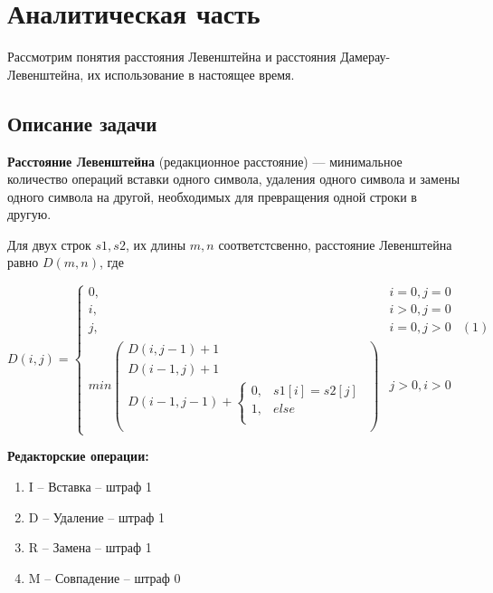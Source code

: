 \documentclass[a4paper,14pt]{article} %
\begin{document}
	\newpage


        \section{Аналитическая часть}
        \hfill
        
        Рассмотрим понятия расстояния Левенштейна и расстояния Дамерау-Левенштейна, их использование в настоящее время. 
        
        \subsection{Описание задачи}
        \hfill
        
        \textbf{Расстояние Левенштейна}  (редакционное расстояние) — минимальное количество операций вставки одного символа, удаления одного символа и замены одного символа на другой, необходимых для превращения одной строки в другую.
        
        \hfill
        
        Для двух строк $s1, s2$, их длины $m, n$ соответстсвенно, расстояние Левенштейна равно $D(m, n)$, где
        
        $$
        D(i, j) = 
        \left\{
		\begin{array}{lll}
 			0 , & i = 0, j = 0  \\
			i , & i > 0, j = 0  \\
			j , &i = 0, j > 0 & (1)\\
			min
			\left(
				\begin{array}{lll}
					D(i, j - 1) + 1 \\
					D(i - 1, j ) + 1 \\
					D(i - 1 , j - 1) +  
								\left\{
									\begin{array}{lll}
										0, & s1[i] = s2[j] \\
										1, & else \\
									\end{array}
								\right.\\
				\end{array}
			\right) & j > 0, i > 0
 		\end{array}
	\right.
        $$
         
        \hfill
        
        \textbf{Редакторские операции: }
	\begin{enumerate}
	 	\item I -- Вставка -- штраф 1
	 	\item D -- Удаление -- штраф 1
 	 	\item R -- Замена -- штраф 1
	 	\item M -- Совпадение -- штраф 0
	\end{enumerate}
	
\end{document}
